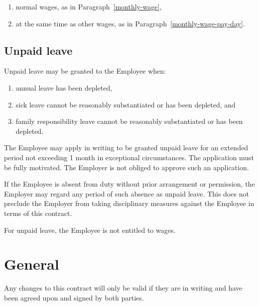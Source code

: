 \documentclass[a4paper,11pt]{article}
\begin{document}
\begin{enumerate}
  \item normal wages, as in Paragraph~\ref{monthly-wage},
  \item at the same time as other wages, as in
    Paragraph~\ref{monthly-wage-pay-day}.
\end{enumerate}

\subsection{Unpaid leave}
\label{unpaid-leave}

\para Unpaid leave may be granted to the Employee when:

\begin{enumerate}
  \item annual leave has been depleted,
  \item sick leave cannot be reasonably substantiated or has been depleted, and
  \item family responsibility leave cannot be reasonably substantiated or has
    been depleted.
\end{enumerate}

\para The Employee may apply in writing to be granted unpaid leave for an
extended period not exceeding 1 month in exceptional circumstances. The
application must be fully motivated. The Employer is not obliged to approve
such an application.

\para If the Employee is absent from duty without prior arrangement or
permission, the Employer may regard any period of such absence as unpaid leave.
This does not preclude the Employer from taking disciplinary measures against
the Employee in terms of this contract.

\para For unpaid leave, the Employee is not entitled to wages.

\section{General}
\label{general}

\para Any changes to this contract will only be valid if they are in writing
and have been agreed upon and signed by both parties.

\vspace{1cm}

\noindent\hrulefill %

\vspace{1cm}
\end{document}
